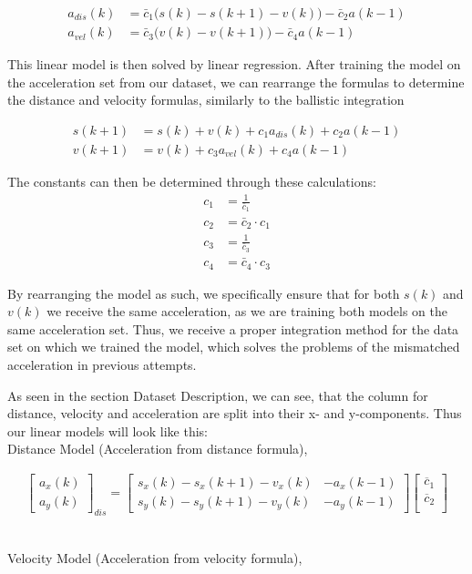 \begin{align} 
    a_{dis}(k) &= \bar{c}_1 \bigl( s(k) - s(k+1) - v(k) \bigr) -\bar{c}_2 a(k-1) \\
    a_{vel}(k) &= \bar{c}_3 \bigl( v(k) - v(k+1) \bigr) -\bar{c}_4 a(k-1) 
\end{align}

This linear model is then solved by linear regression. 
After training the model on the acceleration set from our dataset, we can rearrange the formulas
to determine the distance and velocity formulas, similarly to the ballistic integration

\begin{align} 
    s(k+1) &= s(k) + v(k) + c_1 a_{dis}(k) + c_2 a(k-1) \\
    v(k+1) &= v(k)        + c_3 a_{vel}(k) + c_4 a(k-1)
\end{align}


The constants can then be determined through these calculations:
\begin{align}
   c_1 &= \frac{1}{\bar{c}_1} \\
   c_2 &= \bar{c}_2 \cdot c_1 \\
   c_3 &= \frac{1}{\bar{c}_3} \\
   c_4 &= \bar{c}_4 \cdot c_3
\end{align}

By rearranging the model as such, we specifically ensure that for both $s(k)$ and $v(k)$ we receive the same 
acceleration, as we are training both models on the same acceleration set.
Thus, we receive a proper integration method for the data set on which we trained the model, which solves the 
problems of the mismatched acceleration in previous attempts.

As seen in the section Dataset Description, we can see, that the column for distance, velocity and acceleration are 
split into their x- and y-components.
Thus our linear models will look like this:\\
Distance Model (Acceleration from distance formula),

{\footnotesize

\begin{align} \label{eq:lin_model_acc_dis}
    \begin{bmatrix}
        a_x(k) \\ 
        a_y(k)       
    \end{bmatrix}_{dis}
    =
    \begin{bmatrix}
       s_x(k) - s_x(k+1) - v_x(k) & -a_x(k-1) \\ 
       s_y(k) - s_y(k+1) - v_y(k) & -a_y(k-1)   
    \end{bmatrix}
    \begin{bmatrix}
        \overline c_1 \\
        \overline c_2 \\
   \end{bmatrix}
\end{align}
}\\
Velocity Model (Acceleration from velocity formula),


